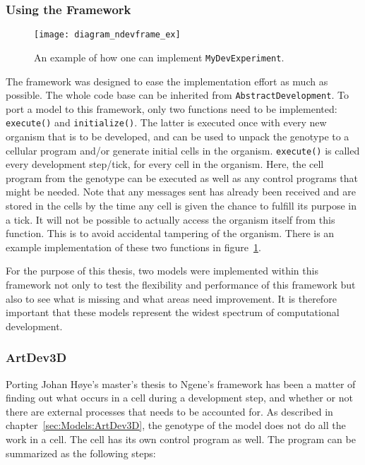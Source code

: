 \subsubsection{Using the Framework}
\begin{figure}[!ht]
	\centering
	\texttt{[image: diagram\_ndevframe\_ex]}
	\caption{An example of how one can implement \texttt{MyDevExperiment}.}
	\label{fig:diagram_ndevframe_ex}
\end{figure}

The framework was designed to ease the implementation effort as much as possible. The whole code base can be inherited from \texttt{AbstractDevelopment}. To port a model to this framework, only two functions need to be implemented: \texttt{execute()} and \texttt{initialize()}. The latter is executed once with every new organism that is to be developed, and can be used to unpack the genotype to a cellular program and/or generate initial cells in the organism. \texttt{execute()} is called every development step/tick, for every cell in the organism. Here, the cell program from the genotype can be executed as well as any control programs that might be needed. Note that any messages sent has already been received and are stored in the cells by the time any cell is given the chance to fulfill its purpose in a tick. It will not be possible to actually access the organism itself from this function. This is to avoid accidental tampering of the organism. There is an example implementation of these two functions in figure~\ref{fig:diagram_ndevframe_ex}.

For the purpose of this thesis, two models were implemented within this framework not only to test the flexibility and performance of this framework but also to see what is missing and what areas need improvement. It is therefore important that these models represent the widest spectrum of computational development.


\subsubsection{ArtDev3D}
\label{sec:Implementation:ArtDev3D}
Porting Johan H{\o}ye's master's thesis\cite{hoye2006} to Ngene's framework has been a matter of finding out what occurs in a cell during a development step, and whether or not there are external processes that needs to be accounted for. As described in chapter~\ref{sec:Models:ArtDev3D}, the genotype of the model does not do all the work in a cell. The cell has its own control program as well. The program can be summarized as the following steps:

